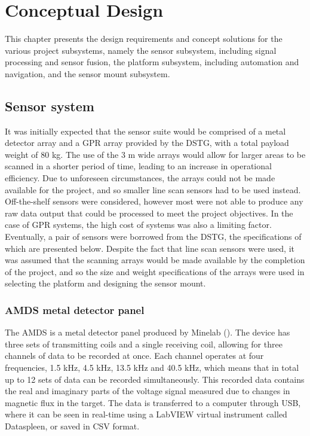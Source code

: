 \documentclass[main.tex]{subfiles}
\begin{document}
\chapter{Conceptual Design}
This chapter presents the design requirements and concept solutions for the various project subsystems, namely the sensor subsystem, including signal processing and sensor fusion, the platform subsystem, including automation and navigation, and the sensor mount subsystem.  

\section{Sensor system}
It was initially expected that the sensor suite would be comprised of a metal detector array and a GPR array provided by the DSTG, with a total payload weight of 80 kg. The use of the 3 m wide arrays would allow for larger areas to be scanned in a shorter period of time, leading to an increase in operational efficiency. Due to unforeseen circumstances, the arrays could not be made available for the project, and so smaller line scan sensors had to be used instead. Off-the-shelf sensors were considered, however most were not able to produce any raw data output that could be processed to meet the project objectives. In the case of GPR systems, the high cost of systems was also a limiting factor. Eventually, a pair of sensors were borrowed from the DSTG, the specifications of which are presented below. Despite the fact that line scan sensors were used, it was assumed that the scanning arrays would be made available by the completion of the project, and so the size and weight specifications of the arrays were used in selecting the platform and designing the sensor mount. 

\subsection{AMDS metal detector panel}
The AMDS is a metal detector panel produced by Minelab (). The device has three sets of transmitting coils and a single receiving coil, allowing for three channels of data to be recorded at once. Each channel operates at four frequencies, 1.5 kHz, 4.5 kHz, 13.5 kHz and 40.5 kHz, which means that in total up to 12 sets of data can be recorded simultaneously. This recorded data contains the real and imaginary parts of the voltage signal measured due to changes in magnetic flux in the target. The data is transferred to a computer through USB, where it can be seen in real-time using a LabVIEW virtual instrument called Dataspleen, or saved in CSV format. 
\end{document}
